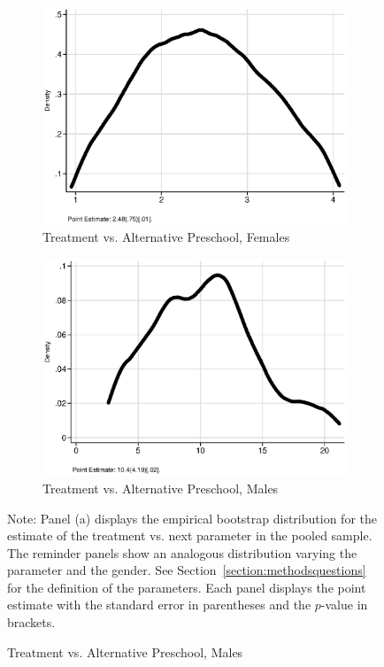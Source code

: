 \begin{figure}
\begin{subfigure}[h]{0.25\textwidth}
\end{subfigure}%
\begin{subfigure}[h]{0.25\textwidth}
	\centering
	\caption{Treatment vs. Alternative Preschool, Females}
		\includegraphics[width=\textwidth]{output/ratios_8_sexf.eps}
\end{subfigure}%
\begin{subfigure}[h]{0.25\textwidth}
	\centering
	\caption{Treatment vs. Alternative Preschool, Males}
		\includegraphics[width=\textwidth]{output/ratios_8_sexm.eps}
\end{subfigure}
\footnotesize \justify
Note: Panel (a) displays the empirical bootstrap distribution for the estimate of the treatment vs. next parameter in the pooled sample. The reminder panels show an analogous distribution varying the parameter and the gender. See Section~\ref{section:methodsquestions} for the definition of the parameters. Each panel displays the point estimate with the standard error in parentheses and the $p$-value in brackets.
\end{figure}
\restoregeometry
\doublespacing

